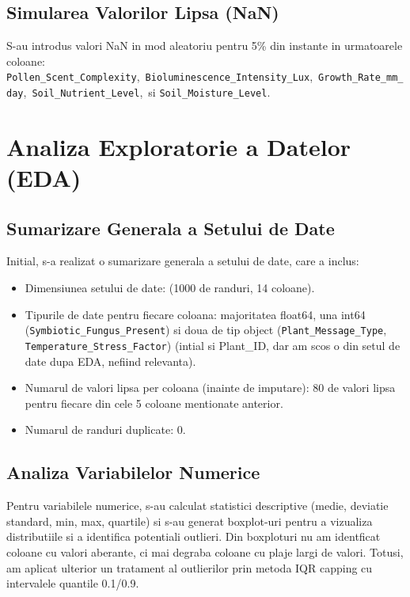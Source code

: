\documentclass[11pt, a4paper]{article}
\begin{document}
\subsection{Simularea Valorilor Lipsa (NaN)}
\sloppy
S-au introdus valori NaN in mod aleatoriu pentru 5\% din instante in urmatoarele coloane: \texttt{Pollen\_Scent\_Complexity},\ \texttt{Bioluminescence\_Intensity\_Lux},\ \texttt{Growth\_Rate\_mm\_day},\ \texttt{Soil\_Nutrient\_Level},\ si \texttt{Soil\_Moisture\_Level}.

\section{Analiza Exploratorie a Datelor (EDA)}

\subsection{Sumarizare Generala a Setului de Date}
Initial, s-a realizat o sumarizare generala a setului de date, care a inclus:
\begin{itemize}[noitemsep, topsep=1pt]
    \item Dimensiunea setului de date: (1000 de randuri, 14 coloane).
    \item Tipurile de date pentru fiecare coloana: majoritatea float64, una int64 (\texttt{Symbiotic\_Fungus\_Present}) si doua de tip object (\texttt{Plant\_Message\_Type}, \texttt{Temperature\_Stress\_Factor}) (intial si Plant_ID, dar am scos o din setul de date dupa EDA, nefiind relevanta).
    \item Numarul de valori lipsa per coloana (inainte de imputare): 80 de valori lipsa pentru fiecare din cele 5 coloane mentionate anterior.
    \item Numarul de randuri duplicate: 0.
\end{itemize}

\subsection{Analiza Variabilelor Numerice}
Pentru variabilele numerice, s-au calculat statistici descriptive (medie, deviatie standard, min, max, quartile) si s-au generat boxplot-uri pentru a vizualiza distributiile si a identifica potentiali outlieri. Din boxploturi nu am identficat coloane cu valori aberante, ci mai degraba coloane cu plaje largi de valori. Totusi, am aplicat ulterior un tratament al outlierilor prin metoda IQR capping cu intervalele quantile 0.1/0.9.
\end{document}
